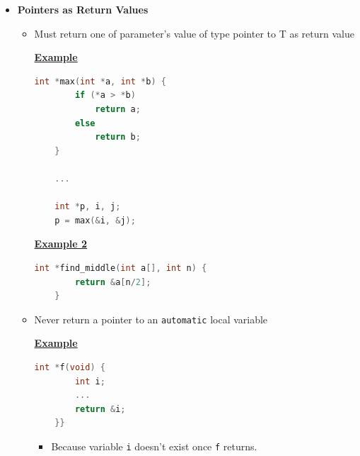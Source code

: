 \documentclass[12pt]{article}
\begin{document}
\begin{enumerate}[1.]
    \begin{itemize}
        \item \textbf{Pointers as Return Values}

        \begin{itemize}
            \item Must return one of parameter's value of type pointer to T as return value

            \bigskip

            \underline{\textbf{Example}}

            \bigskip

\begin{lstlisting}[language=c]
    int *max(int *a, int *b) {
        if (*a > *b)
            return a;
        else
            return b;
    }

    ...

    int *p, i, j;
    p = max(&i, &j);
\end{lstlisting}

            \bigskip

            \underline{\textbf{Example 2}}

            \bigskip

\begin{lstlisting}[language=c]
    int *find_middle(int a[], int n) {
        return &a[n/2];
    }
\end{lstlisting}

            \bigskip

            \item Never return a pointer to an \texttt{automatic} local variable

            \bigskip

            \underline{\textbf{Example}}

            \bigskip


\begin{lstlisting}[language=c]
    int *f(void) {
        int i;
        ...
        return &i;
    }}
\end{lstlisting}

            \bigskip

            \begin{itemize}
                \item Because variable \texttt{i} doesn't exist once \texttt{f} returns.
            \end{itemize}
        \end{itemize}
    \end{itemize}


\end{enumerate}
\end{document}
